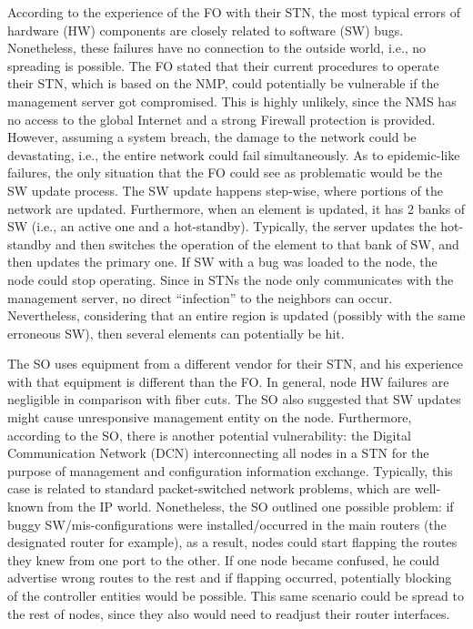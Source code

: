 \documentclass[10pt,draftclsnofoot,onecolumn,journal]{IEEEtran}
\begin{document}
According to the experience of the FO with their STN, the most typical errors of hardware (HW) components are closely related to software (SW) bugs. Nonetheless, these failures have no connection to the outside world, i.e., no spreading is possible. The FO stated that their current procedures to operate their STN, which is based on the NMP, could potentially be vulnerable if the management server got compromised. This is highly unlikely, since the NMS has no access to the global Internet and a strong Firewall protection is provided. However, assuming a system breach, the damage to the network could be devastating, i.e., the entire network could fail simultaneously. As to epidemic-like failures, the only situation that the FO could see as problematic would be the SW update process. The SW update happens step-wise, where portions of the network are updated. Furthermore, when an element is updated, it has 2 banks of SW (i.e., an active one and a hot-standby). Typically, the server updates the hot-standby and then switches the operation of the element to that bank of SW, and then updates the primary one. If SW with a bug was loaded to the node, the node could stop operating. Since in STNs the node only communicates with the management server, no direct ``infection'' to the neighbors can occur. Nevertheless, considering that an entire region is updated (possibly with the same erroneous SW), then several elements can potentially be hit.







The SO uses equipment from a different vendor for their STN, and his experience with that equipment is different than the FO. In general, node HW failures are negligible in comparison with fiber cuts. The SO also suggested that SW updates might cause unresponsive management entity on the node. Furthermore, according to the SO, there is another potential vulnerability: the Digital Communication Network (DCN) interconnecting all nodes in a STN for the purpose of management and configuration information exchange. Typically, this case is related to standard packet-switched network problems, which are well-known from the IP world. Nonetheless, the SO outlined one possible problem: if buggy SW/mis-configurations were installed/occurred in the main routers (the designated router for example), as a result, nodes could start flapping the routes they knew from one port to the other. If one node became confused, he could advertise wrong routes to the rest and if flapping occurred, potentially blocking of the controller entities would be possible. This same scenario could be spread to the rest of nodes, since they also would need to readjust their router interfaces.
\end{document}
